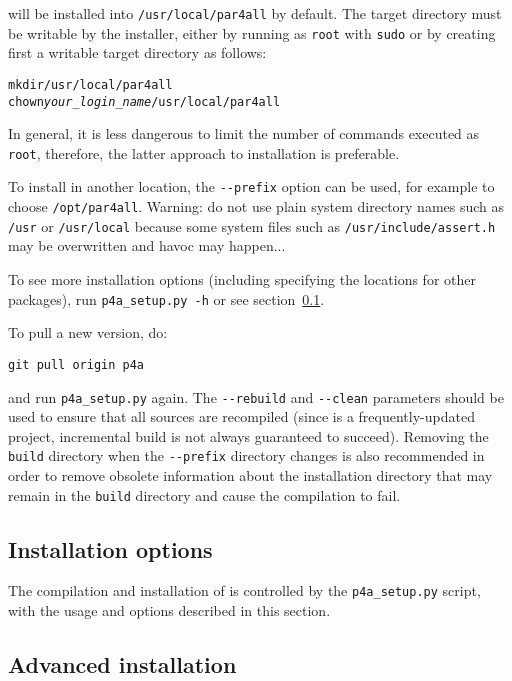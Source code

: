 \documentclass[a4paper]{article}
\begin{document}
\Apfa will be installed into \verb|/usr/local/par4all| by default.
The target directory must be writable by the installer, either by running
as \texttt{root} with \texttt{sudo} or by creating first a
writable target directory as follows:
\begin{alltt}
mkdir /usr/local/par4all
chown \emph{your_login_name} /usr/local/par4all
\end{alltt}
In general, it is less dangerous to limit the number of commands
executed as \texttt{root}, therefore, the latter approach to \Apfa
installation is preferable.

To install in another location, the \verb|--prefix| option can be used,
for example to choose \texttt{/opt/par4all}. Warning: do not use plain
system directory names such as \texttt{/usr} or \texttt{/usr/local}
because some system files such as \texttt{/usr/include/assert.h} may be
overwritten and havoc may happen...

To see more installation options (including specifying the locations for
other packages), run \verb|p4a_setup.py -h| or see
section~\ref{sec:installation_options}.

To pull a new version, do:
\begin{verbatim}
git pull origin p4a
\end{verbatim}

and run \verb|p4a_setup.py| again. The
\verb|--rebuild| and \verb|--clean| parameters should be used to
ensure that all sources are recompiled
(since \Apips is a frequently-updated project, incremental build is
not always guaranteed to succeed). Removing the \texttt{build}
directory
when the \verb|--prefix| directory changes is also recommended
in order to remove obsolete
information about the installation directory that may remain in
the \texttt{build} directory and cause the compilation to fail.

\subsection{Installation options}
\label{sec:installation_options}

The compilation and installation of \Apfa is controlled by the
\verb|p4a_setup.py| script, with the usage and options described in
this section.



\subsection{Advanced installation}
\end{document}
